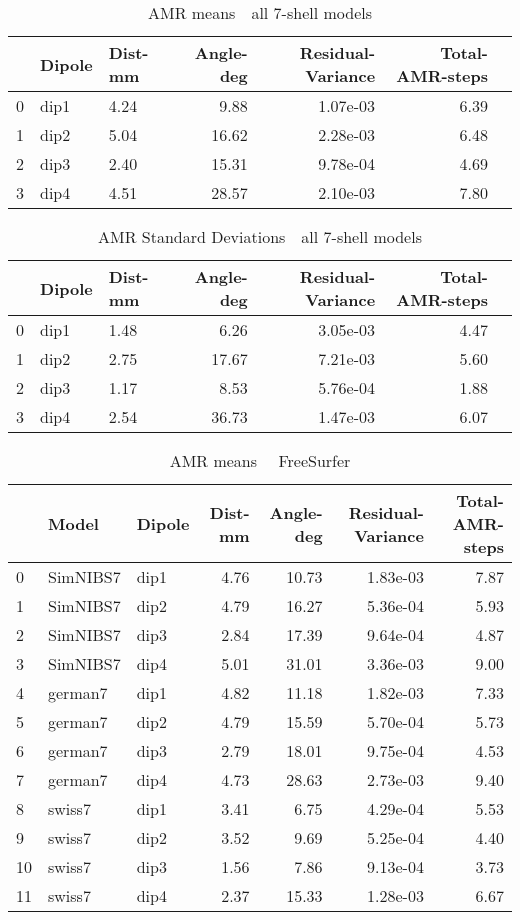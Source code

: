 \documentclass{article}
\begin{document}
\begin{table}
\begin{tabular}{lllrrrr}
\toprule
& Dipole& Dist-mm& Angle-deg& Residual-Variance& Total-AMR-steps\\
\midrule
0 & dip1 & 4.24 & 9.88 & 1.07e-03 & 6.39\\
1 & dip2 & 5.04 & 16.62 & 2.28e-03 & 6.48\\
2 & dip3 & 2.40 & 15.31 & 9.78e-04 & 4.69\\
3 & dip4 & 4.51 & 28.57 & 2.10e-03 & 7.80\\
\end{tabular}
\caption{AMR means\ \textemdash\ all 7-shell models}
\end{table}
\begin{table}
\begin{tabular}{lllrrrr}
\toprule
& Dipole& Dist-mm& Angle-deg& Residual-Variance& Total-AMR-steps\\
\midrule
0 & dip1 & 1.48 & 6.26 & 3.05e-03 & 4.47\\
1 & dip2 & 2.75 & 17.67 & 7.21e-03 & 5.60\\
2 & dip3 & 1.17 & 8.53 & 5.76e-04 & 1.88\\
3 & dip4 & 2.54 & 36.73 & 1.47e-03 & 6.07\\
\end{tabular}
\caption{AMR Standard Deviations\ \textemdash\ all 7-shell models}
\end{table}
\begin{table}
\begin{tabular}{lllrrrr}
\toprule
& Model& Dipole& Dist-mm& Angle-deg& Residual-Variance& Total-AMR-steps\\
\midrule
\rowcolor{lightgray}0 & SimNIBS7 & dip1 & 4.76 & 10.73 & 1.83e-03 & 7.87\\
\rowcolor{lightgray}1 & SimNIBS7 & dip2 & 4.79 & 16.27 & 5.36e-04 & 5.93\\
\rowcolor{lightgray}2 & SimNIBS7 & dip3 & 2.84 & 17.39 & 9.64e-04 & 4.87\\
\rowcolor{lightgray}3 & SimNIBS7 & dip4 & 5.01 & 31.01 & 3.36e-03 & 9.00\\
\rowcolor{yellow}4 & german7 & dip1 & 4.82 & 11.18 & 1.82e-03 & 7.33\\
\rowcolor{yellow}5 & german7 & dip2 & 4.79 & 15.59 & 5.70e-04 & 5.73\\
\rowcolor{yellow}6 & german7 & dip3 & 2.79 & 18.01 & 9.75e-04 & 4.53\\
\rowcolor{yellow}7 & german7 & dip4 & 4.73 & 28.63 & 2.73e-03 & 9.40\\
\rowcolor{pink}8 & swiss7 & dip1 & 3.41 & 6.75 & 4.29e-04 & 5.53\\
\rowcolor{pink}9 & swiss7 & dip2 & 3.52 & 9.69 & 5.25e-04 & 4.40\\
\rowcolor{pink}10 & swiss7 & dip3 & 1.56 & 7.86 & 9.13e-04 & 3.73\\
\rowcolor{pink}11 & swiss7 & dip4 & 2.37 & 15.33 & 1.28e-03 & 6.67\\
\end{tabular}
\caption{AMR means \ \textemdash \ FreeSurfer}
\end{table}
\end{document}
